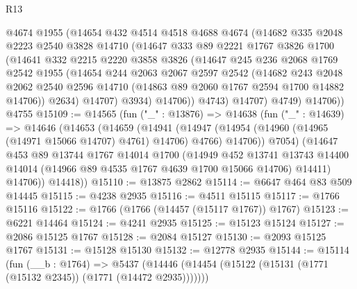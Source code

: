 \begin{lexlean}{R13}
\begin{coremodule}
            @4674
            @1955
            (@14654
              @432
              @4514
              @4518
              @4688
              @4674
              (@14682
                @335
                @2048
                @2223
                @2540
                @3828
                @14710
                (@14647
                  @333
                  @89
                  @2221
                  @1767
                  @3826
                  @1700
                  (@14641
                    @332
                    @2215
                    @2220
                    @3858
                    @3826
                    (@14647
                      @245
                      @236
                      @2068
                      @1769
                      @2542
                      @1955
                      (@14654
                        @244
                        @2063
                        @2067
                        @2597
                        @2542
                        (@14682
                          @243
                          @2048
                          @2062
                          @2540
                          @2596
                          @14710
                          (@14863 @89 @2060 @1767 @2594 @1700 @14882 @14706))
                        @2634)
                      @14707)
                    @3934)
                  @14706))
              @4743)
            @14707)
          @4749)
        @14706))
    @4755
@15109 := @14565
    (fun ("_" : @13876) =>
    @14638
      (fun ("_" : @14639) =>
      @14646
        (@14653
          (@14659
            (@14941
              (@14947 (@14954 (@14960 (@14965 (@14971 @15066 @14707) @4761) @14706) @4766) @14706))
            @7054)
          (@14647
            @453
            @89
            @13744
            @1767
            @14014
            @1700
            (@14949
              @452
              @13741
              @13743
              @14400
              @14014
              (@14966 @89 @4535 @1767 @4639 @1700 @15066 @14706)
              @14411)
            @14706))
        @14418))
@15110 := @13875 @2862
@15114 := @6647 @464 @83 @509 @14445
@15115 := @4238 @2935
@15116 := @4511 @15115
@15117 := @1766 @15116
@15122 := @1766 (@1766 (@14457 (@15117 @1767)) @1767)
@15123 := @6221 @14464
@15124 := @4241 @2935
@15125 := @15123 @15124
@15127 := @2086 @15125 @1767
@15128 := @2084 @15127
@15130 := @2093 @15125 @1767
@15131 := @15128 @15130
@15132 := @12778 @2935
@15144 := @15114
    (fun (__b : @1764) =>
    @5437 (@14446 (@14454 (@15122 (@15131 (@1771 (@15132 @2345)) (@1771 (@14472 @2935)))))))

\end{coremodule}
\end{lexlean}

